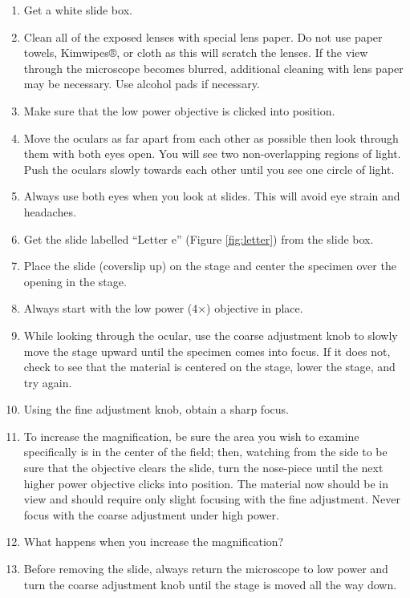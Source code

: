 \begin{enumerate}
\def\labelenumi{\arabic{enumi}.}
\tightlist
\item
  Get a white slide box.
\item
  Clean all of the exposed lenses with special lens paper. Do not use
  paper towels, Kimwipes®, or cloth as this will scratch the lenses. If
  the view through the microscope becomes blurred, additional cleaning
  with lens paper may be necessary. Use alcohol pads if necessary.
\item
  Make sure that the low power objective is clicked into position.
\item
  Move the oculars as far apart from each other as possible then look
  through them with both eyes open. You will see two non-overlapping
  regions of light. Push the oculars slowly towards each other until you
  see one circle of light.
\item
  Always use both eyes when you look at slides. This will avoid eye
  strain and headaches.
\item
  Get the slide labelled ``Letter e'' (Figure \ref{fig:letter}) from the
  slide box.
\item
  Place the slide (coverslip up) on the stage and center the specimen
  over the opening in the stage.
\item
  Always start with the low power (4×) objective in place.
\item
  While looking through the ocular, use the coarse adjustment knob to
  slowly move the stage upward until the specimen comes into focus. If
  it does not, check to see that the material is centered on the stage,
  lower the stage, and try again.
\item
  Using the fine adjustment knob, obtain a sharp focus.
\item
  To increase the magnification, be sure the area you wish to examine
  specifically is in the center of the field; then, watching from the
  side to be sure that the objective clears the slide, turn the
  nose-piece until the next higher power objective clicks into position.
  The material now should be in view and should require only slight
  focusing with the fine adjustment. Never focus with the coarse
  adjustment under high power.
\item
  What happens when you increase the magnification?
\item
  Before removing the slide, always return the microscope to low power
  and turn the coarse adjustment knob until the stage is moved all the
  way down.

\end{enumerate}
